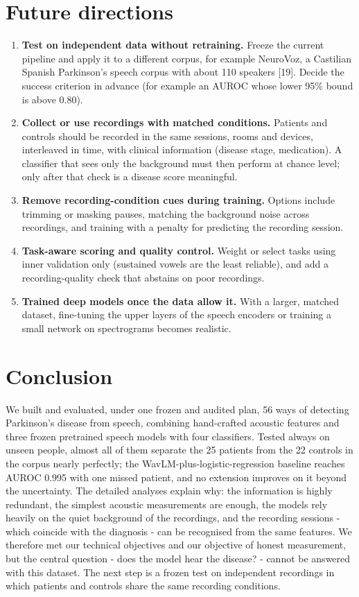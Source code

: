 \documentclass[11pt,a4paper]{article}
\begin{document}
\section{Future directions}\label{sec:future}
\begin{enumerate}\item \textbf{Test on independent data without retraining.} Freeze the current pipeline and apply it to a different corpus, for example NeuroVoz, a Castilian Spanish Parkinson's speech corpus with about 110 speakers [19]. Decide the success criterion in advance (for example an AUROC whose lower 95\% bound is above 0.80).
\item \textbf{Collect or use recordings with matched conditions.} Patients and controls should be recorded in the same sessions, rooms and devices, interleaved in time, with clinical information (disease stage, medication). A classifier that sees only the background must then perform at chance level; only after that check is a disease score meaningful.
\item \textbf{Remove recording-condition cues during training.} Options include trimming or masking pauses, matching the background noise across recordings, and training with a penalty for predicting the recording session.
\item \textbf{Task-aware scoring and quality control.} Weight or select tasks using inner validation only (sustained vowels are the least reliable), and add a recording-quality check that abstains on poor recordings.
\item \textbf{Trained deep models once the data allow it.} With a larger, matched dataset, fine-tuning the upper layers of the speech encoders or training a small network on spectrograms becomes realistic.
\end{enumerate}
\section{Conclusion}\label{sec:conclusion}
We built and evaluated, under one frozen and audited plan, 56 ways of detecting Parkinson's disease from speech, combining hand-crafted acoustic features and three frozen pretrained speech models with four classifiers. Tested always on unseen people, almost all of them separate the 25 patients from the 22 controls in the corpus nearly perfectly; the WavLM-plus-logistic-regression baseline reaches AUROC 0.995 with one missed patient, and no extension improves on it beyond the uncertainty. The detailed analyses explain why: the information is highly redundant, the simplest acoustic measurements are enough, the models rely heavily on the quiet background of the recordings, and the recording sessions - which coincide with the diagnosis - can be recognised from the same features. We therefore met our technical objectives and our objective of honest measurement, but the central question - does the model hear the disease? - cannot be answered with this dataset. The next step is a frozen test on independent recordings in which patients and controls share the same recording conditions.
\end{document}
